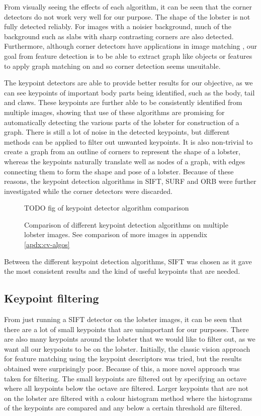 \noindent
From visually seeing the effects of each algorithm, it can be seen that the corner detectors do not work very well for our purpose. The shape of the lobster is not fully detected reliably. For images with a noisier background, much of the background such as slabs with sharp contrasting corners are also detected. Furthermore, although corner detectors have applications in image matching \cite{corner-detection}, our goal from feature detection is to be able to extract graph like objects or features to apply graph matching on and so corner detection seems unsuitable. 

The keypoint detectors are able to provide better results for our objective, as we can see keypoints of important body parts being identified, such as the body, tail and claws. These keypoints are further able to be consistently identified from multiple images, showing that use of these algorithms are promising for automatically detecting the various parts of the lobster for construction of a graph. There is still a lot of noise in the detected keypoints, but different methods can be applied to filter out unwanted keypoints. It is also non-trivial to create a graph from an outline of corners to represent the shape of a lobster, whereas the keypoints naturally translate well as nodes of a graph, with edges connecting them to form the shape and pose of a lobster. Because of these reasons, the keypoint detection algorithms in SIFT, SURF and ORB were further investigated while the corner detectors were discarded.

\begin{figure}[H]
\centering
TODO  fig of keypoint detector algorithm comparison
\caption{Comparison of different keypoint detection algorithms on multiple lobster images. See comparison of more images in appendix \ref{apdx:cv-algos}}
\end{figure}
\noindent

Between the different keypoint detection algorithms, SIFT was chosen as it gave the most consistent results and the kind of useful keypoints that are needed.


\subsection{Keypoint filtering}
From just running a SIFT detector on the lobster images, it can be seen that there are a lot of small keypoints that are unimportant for our purposes. There are also many keypoints around the lobster that we would like to filter out, as we want all our keypoints to be on the lobster. Initially, the classic vision approach for feature matching using the keypoint descriptors \cite{sift} was tried, but the results obtained were surprisingly poor. Because of this, a more novel approach was taken for filtering. The small keypoints are filtered out by specifying an octave where all keypoints below the octave are filtered. Larger keypoints that are not on the lobster are filtered with a colour histogram method where the histograms of the keypoints are compared and any below a certain threshold are filtered.

